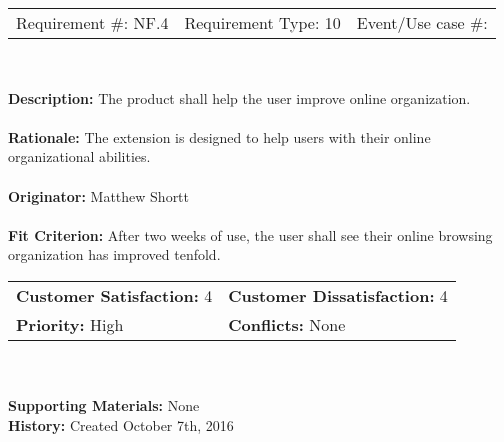 \documentclass[12pt, titlepage]{article}
\begin{document}
\begin{framed}
	
	\begin{center}
		
		\begin{tabular}{ l c r }
			Requirement \#: NF.4 & Requirement Type: 10 & Event/Use case \#: \\
		\end{tabular} \\
	\end{center}
	\textbf{Description:} The product shall help the user improve online organization.\\
	\\
	\textbf{Rationale:} The extension is designed to help users with their online 
	organizational abilities.  \\
	\\
	\textbf{Originator:} Matthew Shortt \\
	\\
	\textbf{Fit Criterion:} After two weeks of use, the user shall see their online browsing 
	organization has improved tenfold.  
	\\
	
	\begin{tabular}{ll}
		\textbf{Customer Satisfaction:} 4 & \textbf{Customer Dissatisfaction:} 4 \\
		\textbf{Priority:} High & \textbf{Conflicts:} None\\
	\end{tabular} \\
	\\
	\textbf{Supporting Materials:} None \\
	\textbf{History:} Created October 7th, 2016
	
\end{framed}
\end{document}
